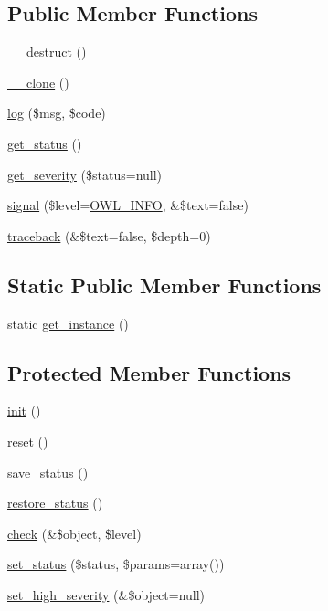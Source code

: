 \subsection*{Public Member Functions}
\begin{DoxyCompactItemize}
\item 
\hyperlink{classLogHandler_aacd0c653489cf221423b9edd62e81458}{\_\-\_\-destruct} ()
\item 
\hyperlink{classLogHandler_a395099dd9f1e9794bfe6a0c771991c3c}{\_\-\_\-clone} ()
\item 
\hyperlink{classLogHandler_a6d0139ed72f63093ca00f949ed5a73cb}{log} (\$msg, \$code)
\item 
\hyperlink{class__OWL_a99ec771fa2c5c279f80152cc09e489a8}{get\_\-status} ()
\item 
\hyperlink{class__OWL_adf9509ef96858be7bdd9414c5ef129aa}{get\_\-severity} (\$status=null)
\item 
\hyperlink{class__OWL_a51ba4a16409acf2a2f61f286939091a5}{signal} (\$level=\hyperlink{owl_8severitycodes_8php_a139328861128689f2f4def6a399d9057}{OWL\_\-INFO}, \&\$text=false)
\item 
\hyperlink{class__OWL_aa29547995d6741b7d2b90c1d4ea99a13}{traceback} (\&\$text=false, \$depth=0)
\end{DoxyCompactItemize}
\subsection*{Static Public Member Functions}
\begin{DoxyCompactItemize}
\item 
static \hyperlink{classLogHandler_aff978ec836c28d7b6e08a84802aa1c6d}{get\_\-instance} ()
\end{DoxyCompactItemize}
\subsection*{Protected Member Functions}
\begin{DoxyCompactItemize}
\item 
\hyperlink{class__OWL_ae0ef3ded56e8a6b34b6461e5a721cd3e}{init} ()
\item 
\hyperlink{class__OWL_a2f2a042bcf31965194c03033df0edc9b}{reset} ()
\item 
\hyperlink{class__OWL_a9e49b9c76fbc021b244c6915ea536d71}{save\_\-status} ()
\item 
\hyperlink{class__OWL_a465eeaf40edd9f9c848841700c32ce55}{restore\_\-status} ()
\item 
\hyperlink{class__OWL_ad6f4f6946f40199dd0333cf219fa500e}{check} (\&\$object, \$level)
\item 
\hyperlink{class__OWL_aea912d0ede9b3c2a69b79072d94d4787}{set\_\-status} (\$status, \$params=array())
\item 
\hyperlink{class__OWL_a576829692a3b66e3d518853bf43abae3}{set\_\-high\_\-severity} (\&\$object=null)
\end{DoxyCompactItemize}
